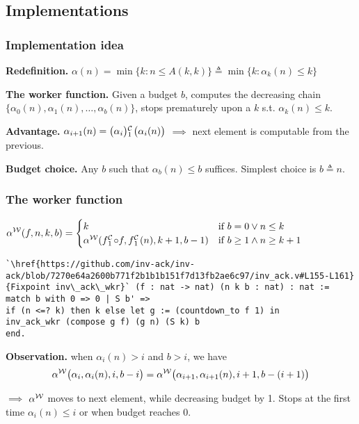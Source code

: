 \subsection{Implementations}
\begin{frame}
\frametitle{Implementation idea}
\textbf{Redefinition.}
$
\alpha(n) = \min\{k: n\le A(k, k) \} \triangleq \min\{k: \alpha_k(n)\le k \}
$

\bigskip

\textbf{The worker function.} Given a budget $b$, computes the decreasing chain $\big\{\alpha_0(n), \alpha_1(n), \ldots, \alpha_b(n) \big\}$, stops prematurely upon a $k$ s.t. $\alpha_k(n)\le k$.

\bigskip

\textbf{Advantage.} $\alpha_{i+1}(n) = \cdt{\big(\alpha_i\big)}{1}\big(\alpha_i(n)\big)$ $\implies$ next element is computable from the previous.

\bigskip

\textbf{Budget choice.} Any $b$ such that $\alpha_b(n) \le b$ suffices. Simplest choice is $b \triangleq n$.
\end{frame}



\begin{frame}[fragile]
\frametitle{The worker function}

$\displaystyle 	\alpha^{\W}(f, n, k, b) = \begin{cases}
k & \text{if } b = 0 \vee n\le k \\ \alpha^{\W}(\cdt{f}{1}\circ f , \cdt{f}{1}(n), k+1, b-1) & \text{if } b \ge 1 \wedge n \ge k+1
\end{cases}$
\begin{lstlisting}
`\href{https://github.com/inv-ack/inv-ack/blob/7270e64a2600b771f2b1b1b151f7d13fb2ae6c97/inv_ack.v#L155-L161} {Fixpoint inv\_ack\_wkr}` (f : nat -> nat) (n k b : nat) : nat :=
match b with 0 => 0 | S b' =>
if (n <=? k) then k else let g := (countdown_to f 1) in
inv_ack_wkr (compose g f) (g n) (S k) b
end.
\end{lstlisting}

\textbf{Observation.}  when $\alpha_i(n) > i$ and $b > i$, we have
$$\alpha^{\mathcal{W}}\big(\alpha_i, \alpha_i(n), i, b - i\big)
= \alpha^{\mathcal{W}}\big(\alpha_{i+1}, \alpha_{i+1}(n), i+1, b - (i+1)\big)$$

$\implies$ $\alpha^{\mathcal{W}}$ moves to next element, while decreasing budget by 1. Stops at the first time $\alpha_i(n)\le i$ or when budget reaches $0$.

\end{frame}